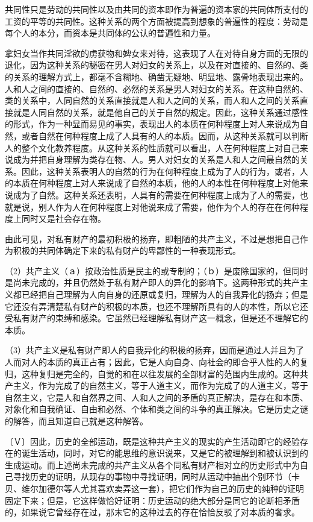 \documentclass[a4paper,twoside,12pt,AutoFakeBold]{ctexart}
\begin{document}
共同性只是劳动的共同性以及由共同的资本即作为普遍的资本家的共同体所支付的工资的平等的共同性。这种关系的两个方面被提高到想象的普遍性的程度：劳动是每个人的本分，而资本是共同体的公认的普遍性和力量。

拿妇女当作共同淫欲的虏获物和婢女来对待，这表现了人在对待自身方面的无限的退化，因为这种关系的秘密在男人对妇女的关系上，以及在对直接的、自然的、类的关系的理解方式上，都毫不含糊地、确凿无疑地、明显地、露骨地表现出来的。人和人之间的直接的、自然的、必然的关系是男人对妇女的关系。在这种自然的、类的关系中，人同自然的关系直接就是人和人之间的关系，而人和人之间的关系直接就是人同自然的关系，就是他自己的关于自然的规定。因此，这种关系通过感性的形式，作为一种显而易见的事实，表现出人的本质在何种程度上对人来说成为自然，或者自然在何种程度上成了人具有的人的本质。因而，从这种关系就可以判断人的整个文化教养程度。从这种关系的性质就可以看出，人在何种程度上对自己来说成为并把自身理解为类存在物、人。男人对妇女的关系是人和人之间最自然的关系。因此，这种关系表明人的自然的行为在何种程度上成为了人的行为，或者，人的本质在何种程度上对人来说成了自然的本质，他的人的本性在何种程度上对他来说成为了自然。这种关系还表明，人具有的需要在何种程度上成为了人的需要，也就是说，别人作为人在何种程度上对他说来成了需要，他作为个人的存在在何种程度上同时又是社会存在物。

由此可见，对私有财产的最初积极的扬弃，即粗陋的共产主义，不过是想把自己作为积极的共同体确定下来的私有财产的卑鄙性的一种表现形式。

（2）共产主义（ａ）按政治性质是民主的或专制的；（ｂ）是废除国家的，但同时是尚未完成的，并且仍然处于私有财产即人的异化的影响下。这两种形式的共产主义都已经把自己理解为人向自身的还原或复归，理解为人的自我异化的扬弃；但是它还没有弄清楚私有财产的积极的本质，也还不理解所具有的人的本性，所以它还受私有财产的束缚和感染。它虽然已经理解私有财产这一概念，但是还不理解它的本质。

（3）共产主义是私有财产即人的自我异化的积极的扬弃，因而是通过人并且为了人而对人的本质的真正占有；因此，它是人向自身、向社会的即合乎人性的人的复归，这种复归是完全的，自觉的和在以往发展的全部财富的范围内生成的。这种共产主义，作为完成了的自然主义，等于人道主义，而作为完成了的人道主义，等于自然主义，它是人和自然界之间、人和人之间的矛盾的真正解决，是存在和本质、对象化和自我确证、自由和必然、个体和类之间的斗争的真正解决。它是历史之谜的解答，而且知道自己就是这种解答。

〔Ｖ〕因此，历史的全部运动，既是这种共产主义的现实的产生活动即它的经验存在的诞生活动，同时，对它的能思维的意识说来，又是它的被理解到和被认识到的生成运动。而上述尚未完成的共产主义从各个同私有财产相对立的历史形式中为自己寻找历史的证明，从现存的事物中寻找证明，同时从运动中抽出个别环节（卡贝、维尔加德尔等人尤其喜欢卖弄这一套），把它们作为自己的历史的纯种的证明固定下来；但是，它这样做恰好证明：历史运动的绝大部分是同它的论断相矛盾的，如果说它曾经存在过，那末它的这种过去的存在恰恰反驳了对本质的奢求。
\end{document}
